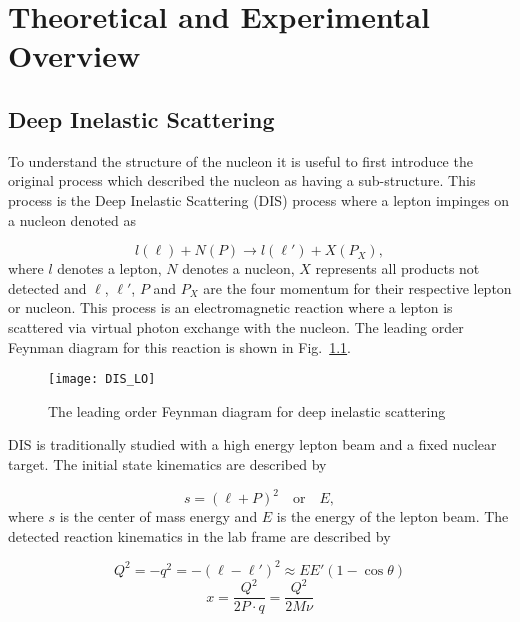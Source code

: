 \chapter{Theoretical and Experimental Overview} \label{ch::theory_exp}
\ifpdf
\graphicspath{{Chapters/Theory/Figs/Raster/}{Chapters/Theory/Figs/PDF/}{Chapters/Theory/Figs/}}
\else \graphicspath{{Chapters/Theory/Figs/Vector/}{Chapters/Theory/Figs/}}
\fi

\section{Deep Inelastic Scattering}
To understand the structure of the nucleon it is useful to first introduce the
original process which described the nucleon as having a sub-structure.  This
process is the Deep Inelastic Scattering (DIS) process where a lepton impinges
on a nucleon denoted as

\begin{equation}
l(\ell) + N(P) \rightarrow l(\ell') + X(P_X),
\end{equation}
\noindent
where $l$ denotes a lepton, $N$ denotes a nucleon, $X$ represents all products
not detected and $\ell$, $\ell'$, $P$ and $P_X$ are the four momentum for their
respective lepton or nucleon.  This process is an electromagnetic reaction where
a lepton is scattered via virtual photon exchange with the nucleon.  The
leading order Feynman diagram for this reaction is shown in
Fig.~\ref{fig::DIS_LO}.

\begin{figure}[h!t]
  \centering
  \texttt{[image: DIS\_LO]}
  \caption{The leading order Feynman diagram for deep inelastic scattering}
  \label{fig::DIS_LO}
\end{figure}

DIS is traditionally studied with a high energy lepton beam and a fixed nuclear
target.  The initial state kinematics are described by

\begin{equation}
  s = (\ell+P)^2 \quad \mathrm{or} \quad E,
\end{equation}
\noindent
where $s$ is the center of mass energy and $E$ is the energy of the lepton beam.
The detected reaction kinematics in the lab frame are described by

\begin{multicols}{2}
  \noindent
  \begin{equation}
    \label{equ::DIS_Q2}
    Q^2 = -q^2 = -(\ell - \ell')^2 \approx EE'(1-\cos\theta )
  \end{equation}
  \begin{equation}
      \label{equ::BjorkenX}
      x = \frac{Q^2}{2P \cdot q} = \frac{Q^2}{2M\nu}
  \end{equation}
\end{multicols}

